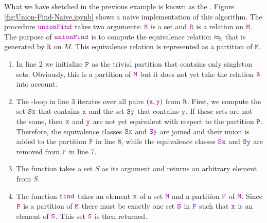 What we have sketched in the previous example is known as the .
Figure \ref{fig:Union-Find-Naive.ipynb} shows a naive implementation of this algorithm.  The
procedure $\mytt{unionFind}$ takes two arguments: $\mytt{M}$ is a set and $\mytt{R}$ is a relation
on $\mytt{M}$.  The purpose of $\mytt{unionFind}$ is to compute the equivalence relation $\approx_\mytt{R}$
that is generated by $\mytt{R}$ on $M$.  This equivalence relation is represented as a partition of $\mytt{M}$.
\begin{enumerate}
\item In line 2 we initialize $\mytt{P}$ as the trivial partition that contains only singleton
      sets.  Obviously, this is a partition of $\mytt{M}$ but it does not yet take the
      relation $\mytt{R}$ into account.
\item The -loop in line 3 iterates over all pairs $(\mytt{x},\mytt{y})$ from $\mytt{R}$.
      First, we compute the set $\mytt{Sx}$ that contains $\mytt{x}$ and the set $\mytt{Sy}$ that
      contains $\mytt{y}$.  If these sets are not the same, then $\mytt{x}$ and $\mytt{y}$ are not
      yet equivalent with respect to the partition $\mytt{P}$.  Therefore, the equivalence classes
      $\mytt{Sx}$ and $\mytt{Sy}$ are joined and their union is added to the partition 
      $\mytt{P}$ in line 8, while the equivalence classes $\mytt{Sx}$ and $\mytt{Sy}$ are
      removed from $\mytt{P}$ in line 7.
\item The function  takes a set $S$ as its argument and returns an
      arbitrary element from $S$. 
\item The function $\mytt{find}$ takes an element $\mytt{x}$ of a set $\mytt{M}$ and a partition
      $\mytt{P}$ of $\mytt{M}$.  Since $\mytt{P}$ is a partition of $\mytt{M}$ there must be exactly
      one set $\mytt{S}$ in $\mytt{P}$ such that $\mytt{x}$ is an element of $\mytt{S}$.  This set
      $\mytt{S}$ is then returned.
\end{enumerate}

